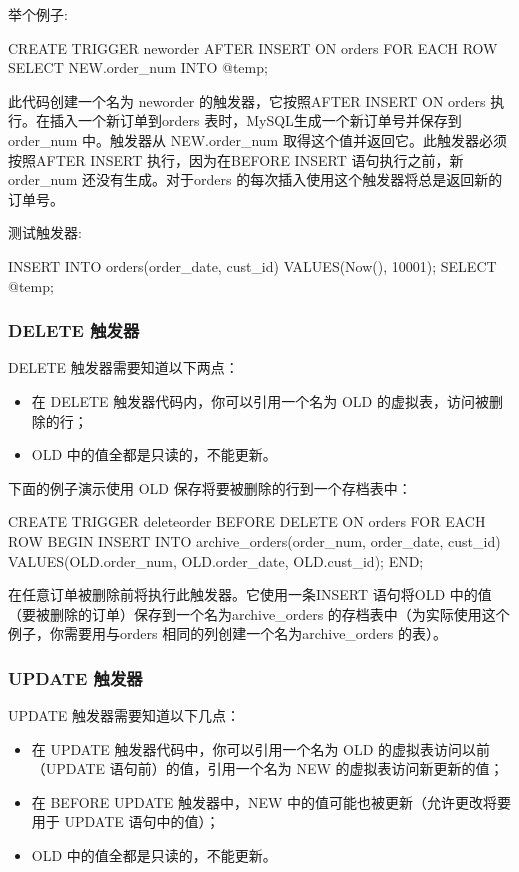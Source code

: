 举个例子:
\begin{sql}
CREATE TRIGGER neworder AFTER INSERT ON orders
    FOR EACH ROW SELECT NEW.order_num INTO @temp;
\end{sql}

此代码创建一个名为 neworder 的触发器，它按照AFTER INSERT ON orders 执行。在插入一个新订单到orders 表时，MySQL生成一个新订单号并保存到 order\_num 中。触发器从 NEW.order\_num 取得这个值并返回它。此触发器必须按照AFTER INSERT 执行，因为在BEFORE INSERT 语句执行之前，新order\_num 还没有生成。对于orders 的每次插入使用这个触发器将总是返回新的订单号。

测试触发器:
\begin{sql}
INSERT INTO orders(order_date, cust_id)
    VALUES(Now(), 10001);
SELECT @temp;
\end{sql}

\subsubsection{DELETE 触发器}

DELETE 触发器需要知道以下两点：

\begin{itemize}
    \item 在 DELETE 触发器代码内，你可以引用一个名为 OLD 的虚拟表，访问被删除的行；
    \item OLD 中的值全都是只读的，不能更新。
\end{itemize}

下面的例子演示使用 OLD 保存将要被删除的行到一个存档表中：

\begin{sql}
CREATE TRIGGER deleteorder BEFORE DELETE ON orders
FOR EACH ROW
BEGIN
   INSERT INTO archive_orders(order_num, order_date, cust_id)
   VALUES(OLD.order_num, OLD.order_date, OLD.cust_id);
END;
\end{sql}

在任意订单被删除前将执行此触发器。它使用一条INSERT 语句将OLD 中的值（要被删除的订单）保存到一个名为archive\_orders 的存档表中（为实际使用这个例子，你需要用与orders 相同的列创建一个名为archive\_orders 的表）。

\subsubsection{UPDATE 触发器}

UPDATE 触发器需要知道以下几点：

\begin{itemize}
    \item 在 UPDATE 触发器代码中，你可以引用一个名为 OLD 的虚拟表访问以前（UPDATE 语句前）的值，引用一个名为 NEW 的虚拟表访问新更新的值；
    \item 在 BEFORE UPDATE 触发器中，NEW 中的值可能也被更新（允许更改将要用于 UPDATE 语句中的值）；
    \item OLD 中的值全都是只读的，不能更新。
\end{itemize}

